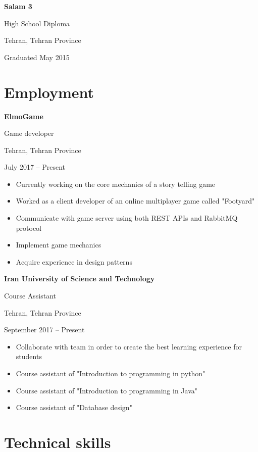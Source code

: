\documentclass{article}
\begin{document}
\begin{multicols}{2}
\noindent \textbf{Salam 3} \par
High School Diploma \par
Tehran, Tehran Province \par
Graduated May 2015 \par
\par
\end{multicols}


\section {Employment}
\noindent \textbf{ElmoGame} \par
Game developer \par
Tehran, Tehran Province \par
July 2017 – Present \par
\begin{itemize}
        \item Currently working on the core mechanics of a story telling game
        \item Worked as a client developer of an online multiplayer game called "Footyard"
        \item Communicate with game server using both REST APIs and RabbitMQ protocol
        \item Implement game mechanics 
        \item Acquire experience in design patterns
\end{itemize}

\pagebreak

\noindent \textbf{Iran University of Science and Technology} \par
Course Assistant \par
Tehran, Tehran Province \par
September 2017 – Present \par
\begin{itemize}
        \item Collaborate with team in order to create the best learning experience for students
        \item Course assistant of "Introduction to programming in python"
        \item Course assistant of "Introduction to programming in Java"
        \item Course assistant of "Database design"
\end{itemize}

\section{Technical skills}
\end{document}
